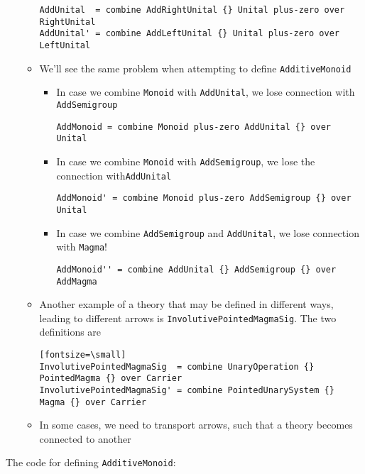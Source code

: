 \documentclass{article}
\begin{document}
\begin{itemize}
\begin{itemize}
\begin{Verbatim}[fontsize=\small]
AddUnital  = combine AddRightUnital {} Unital plus-zero over RightUnital
AddUnital' = combine AddLeftUnital {} Unital plus-zero over LeftUnital 
	\end{Verbatim}
	\item We'll see the same problem when attempting to define \verb|AdditiveMonoid|
	\begin{itemize}
		\item In case we combine \verb|Monoid| with \verb|AddUnital|, we lose connection with \verb|AddSemigroup|
		\begin{Verbatim}[fontsize=\small]
AddMonoid = combine Monoid plus-zero AddUnital {} over Unital
		\end{Verbatim}
		\item In case we combine \verb|Monoid| with \verb|AddSemigroup|, we lose the connection with\verb|AddUnital| 
		\begin{Verbatim}[fontsize=\small]
AddMonoid' = combine Monoid plus-zero AddSemigroup {} over Unital
	    \end{Verbatim}	
		\item In case we combine \verb|AddSemigroup| and \verb|AddUnital|, we lose connection with \verb|Magma|! 
	    \begin{Verbatim}[fontsize=\small]
AddMonoid'' = combine AddUnital {} AddSemigroup {} over AddMagma
       \end{Verbatim}		
	\end{itemize}
	\item Another example of a theory that may be defined in different ways, leading to different arrows is \verb|InvolutivePointedMagmaSig|. The two definitions are 
	\begin{verbatim}[fontsize=\small]
InvolutivePointedMagmaSig  = combine UnaryOperation {} PointedMagma {} over Carrier 
InvolutivePointedMagmaSig' = combine PointedUnarySystem {} Magma {} over Carrier 
	\end{verbatim}
	\item In some cases, we need to transport arrows, such that a theory becomes connected to another 
	\end{itemize} 
\end{itemize}
The code for defining \verb|AdditiveMonoid|: 
\end{document}
